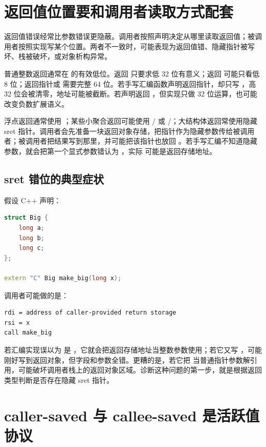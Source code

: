 \section{返回值位置要和调用者读取方式配套}

返回值错误经常比参数错误更隐蔽。调用者按照声明决定从哪里读取返回值；被调用者按照实现写某个位置。两者不一致时，可能表现为返回值错、隐藏指针被写坏、栈被破坏，或对象析构异常。

普通整数返回通常在  的有效低位。返回  只要求低 32 位有意义；返回  可能只看低 8 位；返回指针或  需要完整 64 位。若手写汇编函数声明返回指针，却只写 ，高 32 位会被清零，地址可能被截断。若声明返回 ，但实现只做 32 位运算，也可能改变负数扩展语义。

浮点返回通常使用 ；某些小聚合返回可能使用 / 或 /；大结构体返回常使用隐藏 sret 指针。调用者会先准备一块返回对象存储，把指针作为隐藏参数传给被调用者；被调用者把结果写到那里，并可能把该指针也放回 。若手写汇编不知道隐藏参数，就会把第一个显式参数错认为 ，实际  可能是返回存储地址。

\subsection{sret 错位的典型症状}

假设 C++ 声明：

\begin{lstlisting}[language=C++]
struct Big {
    long a;
    long b;
    long c;
};

extern "C" Big make_big(long x);
\end{lstlisting}

调用者可能做的是：

\begin{lstlisting}
rdi = address of caller-provided return storage
rsi = x
call make_big
\end{lstlisting}

若汇编实现误以为  是 ，它就会把返回存储地址当整数参数使用；若它又写 \code{[rdi]}，可能刚好写到返回对象，但字段和参数全错。更糟的是，若它把  当普通指针参数解引用，可能破坏调用者栈上的返回对象区域。诊断这种问题的第一步，就是根据返回类型判断是否存在隐藏 sret 指针。

\section{caller-saved 与 callee-saved 是活跃值协议}

